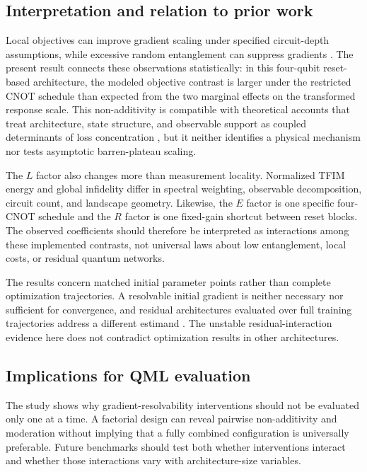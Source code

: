 \documentclass[pdflatex,sn-mathphys-num,Numbered]{sn-jnl}
\begin{document}
\subsection{Interpretation and relation to prior work}

Local objectives can improve gradient scaling under specified circuit-depth assumptions, while excessive random entanglement can suppress gradients \cite{cerezo2021costfunction,ortizmarrero2021entanglement,patti2021entanglement}. The present result connects these observations statistically: in this four-qubit reset-based architecture, the modeled objective contrast is larger under the restricted CNOT schedule than expected from the two marginal effects on the transformed response scale. This non-additivity is compatible with theoretical accounts that treat architecture, state structure, and observable support as coupled determinants of loss concentration \cite{ragone2024lie}, but it neither identifies a physical mechanism nor tests asymptotic barren-plateau scaling.

The $L$ factor also changes more than measurement locality. Normalized TFIM energy and global infidelity differ in spectral weighting, observable decomposition, circuit count, and landscape geometry. Likewise, the $E$ factor is one specific four-CNOT schedule and the $R$ factor is one fixed-gain shortcut between reset blocks. The observed coefficients should therefore be interpreted as interactions among these implemented contrasts, not universal laws about low entanglement, local costs, or residual quantum networks.

The results concern matched initial parameter points rather than complete optimization trajectories. A resolvable initial gradient is neither necessary nor sufficient for convergence, and residual architectures evaluated over full training trajectories address a different estimand \cite{anschuetz2022traps,grant2019identity,skolik2021layerwise,kashif2024resqnets}. The unstable residual-interaction evidence here does not contradict optimization results in other architectures.

\subsection{Implications for QML evaluation}

The study shows why gradient-resolvability interventions should not be evaluated only one at a time. A factorial design can reveal pairwise non-additivity and moderation without implying that a fully combined configuration is universally preferable. Future benchmarks should test both whether interventions interact and whether those interactions vary with architecture-size variables.
\end{document}
